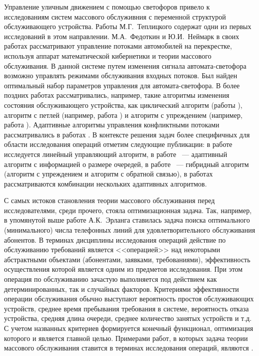 Управление уличным движением с помощью светофоров привело к исследованиям систем массового обслуживния с переменной структурой обслуживающего устройства. Работы М.Г.~Теплицкого \cite{Teplicki:1968, Teplicki:1969} содержат одни из первых исследований в этом направлении. М.А.~Федоткин и Ю.И.~Неймарк в своих работах \cite{Neimark:1966, Fedotkin:1969}  рассматривают управление потоками автомобилей на перекрестке, используя аппарат математической кибернетики и теории массового обслуживания. В данной системе путем изменения сигнала автомата-светофора возможно управлять режимами обслуживания входных потоков. Был найден оптимальный набор параметров управления для автомата-светофора. В более поздних работах рассматривались, например, такие алгоритмы изменения состояния обслуживающего устройства, как циклический алгоритм (работы \cite{Proidakova:2008, Fedotkin:2014, Zorin:2014}), алгоритм с петлей (например, работа \cite{Zorin:2017}) и алгоритм с упреждением (например, работа \cite{Kuvykina:1990}). Адаптивные алгоритмы управления конфликтными потоками рассматривались в работах \cite{Kudelin:1996, Litvak:2000}. В контексте решения задач более специфичных для области исследования операций отметим следующие публикации: в работе \cite{Dunne:1964} исследуется линейный управляющий алгоритм, в работе \cite{Gordon:1969}~--- адаптивный алгоритм с информацией о размере очередей, в работе \cite{Day2012}~--- гибридный алгоритм (алгоритм с упреждением и алгоритм с обратной связью), в работах \cite{Vasilakos:1990,Cotton:1995,Mason:1999,Kokkonis:2016} рассматриваются комбинации нескольких адаптивных алгоритмов.

С самых истоков становления теории массового обслуживания перед исследователями, среди прочего, стояла оптимизационная задача. Так, например, в упомянутой выше работе  А.К.~Эрланга ставилась задача поиска оптимального (минимального) числа телефонных линий для удовлетворительного обслуживания абонентов. В терминах дисциплины исследования операций действие по обслуживанию требований является <<операцией>> над некоторыми абстрактными объектами (абонентами, заявками, требованиями), эффективность осуществления которой является одним из предметов исследования. При этом операция по обслуживанию зачастую выполняется под действием как детерминированных, так и случайных факторов. Критериями эффективности операции обслуживания обычно выступают вероятность простоя обслуживающих устройств, среднее время пребывания требования в системе, вероятность отказа устройства, средняя длина очереди, среднее количество занятых устройств и т.д. С учетом названных критериев формируется конечный функционал, оптимизация которого и является главной целью. Примерами работ, в которых задача теории массового обслуживания ставится в терминах исследования операций, являются \cite{Bailey:1957, Flagle:1962, Buslenko:1968}.

